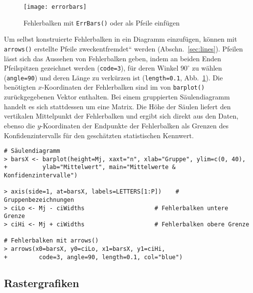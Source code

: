 \begin{figure}[ht]
\centering
\texttt{[image: errorbars]}
\vspace*{-0.5em}
\caption{Fehlerbalken mit \lstinline!ErrBars()! oder als Pfeile einfügen}
\label{fig:errorbars}
\end{figure}

Um selbst konstruierte Fehlerbalken in ein Diagramm einzufügen, können mit \lstinline!arrows()! erstellte Pfeile {\quotedblbase}zweckentfremdet{\textquotedblleft} werden (Abschn.\ \ref{sec:lines}). Pfeilen lässt sich das Aussehen von Fehlerbalken geben, indem an beiden Enden Pfeilspitzen gezeichnet werden (\lstinline!code=3!), für deren Winkel $90^{\circ}$ zu wählen (\lstinline!angle=90!) und deren Länge zu verkürzen ist (\lstinline!length=0.1!, Abb.\ \ref{fig:errorbars}). Die benötigten $x$-Koordinaten der Fehlerbalken sind im von \lstinline!barplot()! zurückgegebenen Vektor enthalten. Bei einem gruppierten Säulendiagramm handelt es sich stattdessen um eine Matrix. Die Höhe der Säulen liefert den vertikalen Mittelpunkt der Fehlerbalken und ergibt sich direkt aus den Daten, ebenso die $y$-Koordinaten der Endpunkte der Fehlerbalken als Grenzen des Konfidenzintervalls für den geschätzten statistischen Kennwert.
\begin{lstlisting}
# Säulendiagramm
> barsX <- barplot(height=Mj, xaxt="n", xlab="Gruppe", ylim=c(0, 40),
+          ylab="Mittelwert", main="Mittelwerte & Konfidenzintervalle")

> axis(side=1, at=barsX, labels=LETTERS[1:P])    # Gruppenbezeichnungen
> ciLo <- Mj - ciWidths                    # Fehlerbalken untere Grenze
> ciHi <- Mj + ciWidths                    # Fehlerbalken obere Grenze

# Fehlerbalken mit arrows()
> arrows(x0=barsX, y0=ciLo, x1=barsX, y1=ciHi,
+         code=3, angle=90, length=0.1, col="blue")
\end{lstlisting}

\subsection{Rastergrafiken}
\label{sec:rasterIm}

